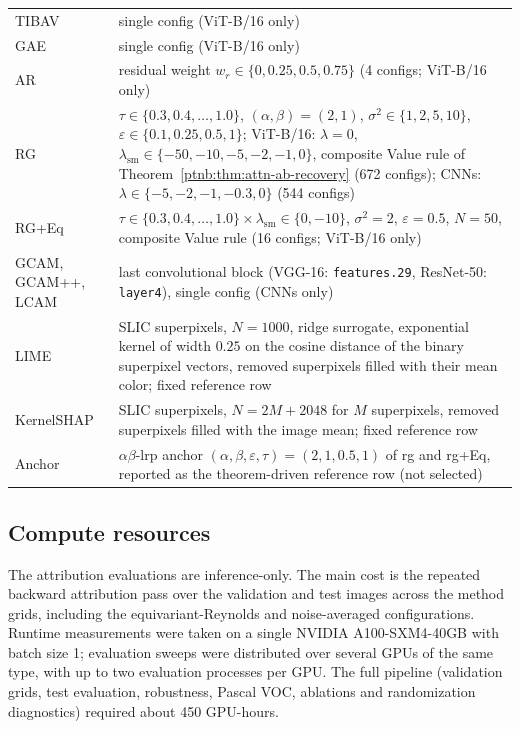 \begin{table}[H]
{\begin{tabularx}{\linewidth}{@{}l >{\raggedright\arraybackslash}X@{}}
        TIBAV & single config \quad (ViT-B/16 only) \\
        GAE & single config \quad (ViT-B/16 only) \\
        AR & residual weight $w_r \in \{0, 0.25, 0.5, 0.75\}$ \quad (4 configs; ViT-B/16 only) \\
        RG & $\tau \in \{0.3, 0.4, \ldots, 1.0\}$, $(\alpha,\beta){=}(2,1)$, $\sigma^2 \in \{1, 2, 5,
            10\}$, $\varepsilon \in \{0.1, 0.25, 0.5, 1\}$; ViT-B/16: $\lambda{=}0$, $\lambda_{\mathrm{sm}} \in
            \{-50, -10, -5, -2, -1, 0\}$, composite Value rule of Theorem~\ref{ptnb:thm:attn-ab-recovery} (672
        configs); CNNs: $\lambda \in \{-5, -2, -1, -0.3, 0\}$ (544 configs) \\
        RG+Eq & $\tau \in \{0.3, 0.4, \ldots, 1.0\} \times \lambda_{\mathrm{sm}} \in \{0, -10\}$,
        $\sigma^2{=}2$, $\varepsilon{=}0.5$, $N{=}50$, composite Value rule \quad (16 configs; ViT-B/16
        only) \\
        GCAM, GCAM++, LCAM & last convolutional block (VGG-16: \texttt{features.29}, ResNet-50:
        \texttt{layer4}), single config \quad (CNNs only) \\
        LIME & 80 SLIC superpixels, $N{=}1000$, ridge surrogate, exponential kernel of width $0.25$ on the
        cosine distance of the binary superpixel vectors, removed superpixels filled with their mean color;
        fixed reference row \\
        KernelSHAP & 80 SLIC superpixels, $N{=}2M{+}2048$ for $M$ superpixels, removed superpixels filled with
        the image mean; fixed reference row \\
        Anchor & $\alpha\beta$-\ac{lrp} anchor $(\alpha,\beta,\varepsilon,\tau){=}(2,1,0.5,1)$ of \ac{rg}
        and \ac{rg}+Eq, reported as the theorem-driven reference row (not selected) \\
        \bottomrule
    \end{tabularx}
}%
\end{table}

\subsection{Compute resources}\label{ptnb:app:compute-resources}
The attribution evaluations are inference-only. The main cost is the repeated backward attribution pass over the validation and test images across the method grids, including the equivariant-Reynolds and noise-averaged configurations. Runtime measurements were taken on a single NVIDIA A100-SXM4-40GB with batch size 1; evaluation sweeps were distributed over several GPUs of the same type, with up to two evaluation processes per GPU. The full pipeline (validation grids, test evaluation, robustness, Pascal VOC, ablations and randomization diagnostics) required about 450 GPU-hours.

